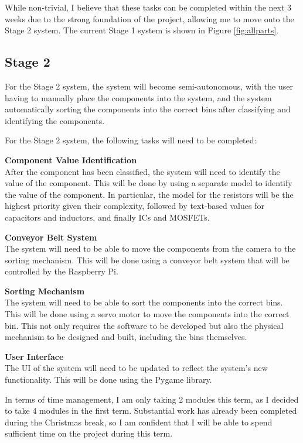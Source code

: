 While non-trivial, I believe that these tasks can be completed within the next 3 weeks due to the strong foundation of the project, allowing me to move onto the Stage 2 system.
The current Stage 1 system is shown in Figure \ref*{fig:allparts}.

\subsection{Stage 2}
For the Stage 2 system, the system will become semi-autonomous, with the user having to manually place the components into the system, and the system
automatically sorting the components into the correct bins after classifying and identifying the components. 

For the Stage 2 system, the following tasks will need to be completed:
\begin{mylist}
    \item \textbf{Component Value Identification} \\
    After the component has been classified, the system will need to identify the value of the component. This will be done by using
    a separate model to identify the value of the component. In particular, the model for the resistors will be the highest
    priority given their complexity, followed by text-based values for capacitors and inductors, and finally ICs and MOSFETs.
    \item \textbf{Conveyor Belt System} \\
    The system will need to be able to move the components from the camera to the sorting mechanism. This will be done using a conveyor belt system
    that will be controlled by the Raspberry Pi.
    \item \textbf{Sorting Mechanism} \\
    The system will need to be able to sort the components into the correct bins. This will be done using a servo motor to move the components into the correct bin.
    This not only requires the software to be developed but also the physical mechanism to be designed and built, including the bins themselves.
    \item \textbf{User Interface} \\
    The UI of the system will need to be updated to reflect the system's new functionality. This will be done using the Pygame library\cite{pygamedoc}.
\end{mylist}

\noindent
In terms of time management, I am only taking 2 modules this term, as I decided to take 4 modules in the first term. Substantial work has already been completed
during the Christmas break, so I am confident that I will be able to spend sufficient time on the project during this term.

